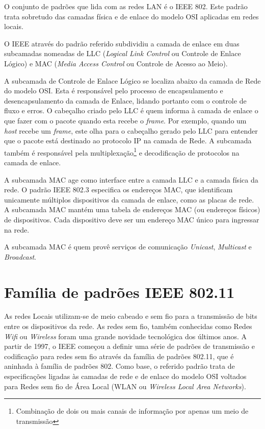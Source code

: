 \documentclass[
12pt,				%
openright,			%
oneside,			%
a4paper,			%
brazil,				%
]{abntex2}
\begin{document}
	\par O conjunto de padrões que lida com as redes LAN é o IEEE 802. Este padrão trata sobretudo das camadas física e de enlace do modelo OSI aplicadas em redes locais.
	
	\par O IEEE através do padrão referido subdividiu a camada de enlace em duas subcamadas nomeadas de LLC (\textit{Logical Link Control} ou Controle de Enlace Lógico) e MAC (\textit{Media Access Control} ou Controle de Acesso ao Meio).
	
	\par A subcamada de Controle de Enlace Lógico se localiza abaixo da camada de Rede do modelo OSI. Esta é responsável pelo processo de encapsulamento e desencapsulamento da camada de Enlace, lidando portanto com o controle de fluxo e erros. O cabeçalho criado pelo LLC é quem informa à camada de enlace o que fazer com o pacote quando esta recebe o \textit{frame}. Por exemplo, quando um \textit{host} recebe um \textit{frame}, este olha para o cabeçalho gerado pelo LLC para entender que o pacote está destinado ao protocolo IP na camada de Rede. A subcamada também é responsável pela multiplexação{\footnote{Combinação de dois ou mais canais de informação por apenas um meio de transmissão}} e decodificação de protocolos na camada de enlace.
	
	\par A subcamada MAC age como interface entre a camada LLC e a camada física da rede. O padrão IEEE 802.3 especifica os endereços MAC, que identificam unicamente múltiplos dispositivos da camada de enlace, como as placas de rede. A subcamada MAC mantém uma tabela de endereços MAC (ou endereços físicos) de dispositivos. Cada dispositivo deve ser um endereço MAC único para ingressar na rede.
	
	\par A subcamada MAC é quem provê serviços de comunicação \textit{Unicast}, \textit{Multicast} e \textit {Broadcast}.
	
	\section{Família de padrões IEEE 802.11}
	
	\par As redes Locais utilizam-se de meio cabeado e sem fio para a transmissão de bits entre os dispositivos da rede. As redes sem fio, também conhecidas como Redes \textit{Wifi} ou \textit{Wireless} foram uma grande novidade tecnológica dos últimos anos. A partir de 1997, o IEEE começou a definir uma série de padrões de transmissão e codificação para redes sem fio através da família de padrões 802.11, que é aninhada à família de padrões 802. Como base, o referido padrão trata de especificações ligadas às camadas de rede e de enlace do modelo OSI voltados para Redes sem fio de Área Local (WLAN ou \textit{Wireless Local Area Networks}).
	
\end{document}
